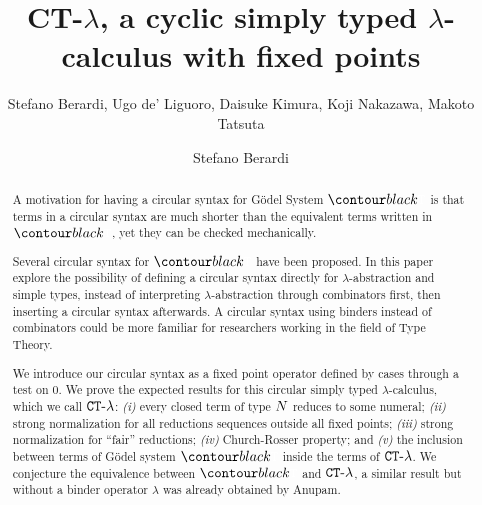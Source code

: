 \documentclass{article}
\begin{document}
\sloppy 
{}



\ifdraft

\title{CT-$\lambda$, a cyclic simply typed $\lambda$-calculus with fixed points}

\author{Stefano Berardi,  Ugo de' Liguoro, Daisuke Kimura, Koji Nakazawa, Makoto Tatsuta}
\date{}

\else

\title[Equivalence]{}

\author[S. Berardi]{Stefano Berardi}
\address{Universit\`{a} di Torino,
Torino, Italy}


\fi

\maketitle

\begin{abstract}
A motivation for having a circular syntax for G\"{o}del System $\systemT$ is that terms 
in a circular syntax are much shorter than the equivalent terms written in $\systemT$, 
yet they can be checked mechanically.

Several circular syntax for $\systemT$ have been proposed.
In this paper explore the possibility of defining a circular syntax
directly for $\lambda$-abstraction and simple types, instead of interpreting
 $\lambda$-abstraction through combinators first, then inserting a  circular syntax afterwards.
A circular syntax using binders instead of combinators
could be more familiar for researchers working in the field of Type Theory.

We introduce our circular syntax as a fixed point operator defined by cases through a test on $0$.
We prove the expected results for this circular simply typed $\lambda$-calculus, which we call ${ {\tt CT}\mbox{-}\lambda}$: 
\emph{(i)} every closed term of type ${N}$ reduces to some numeral;
\emph{(ii)}  strong normalization for all reductions sequences outside all fixed points; 
\emph{(iii)}  strong normalization for ``fair'' reductions; \emph{(iv)} Church-Rosser property;
and \emph{(v)} the inclusion between terms of G\"{o}del system $\systemT$
inside the terms of ${ {\tt CT}\mbox{-}\lambda}$. 
We conjecture the equivalence between $\systemT$ and ${ {\tt CT}\mbox{-}\lambda}$,
a similar result but without a binder operator $\lambda$ was already obtained by Anupam.



\end{abstract}
\end{document}
